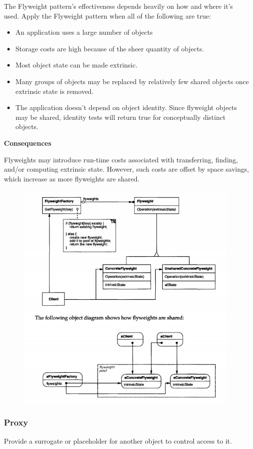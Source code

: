 \documentclass{article}
\begin{document}
The Flyweight pattern's effectiveness depends heavily on how and where it's
used. Apply the Flyweight pattern when all of the following are true:
\begin{itemize}
    \item An application uses a large number of objects
    \item Storage costs are high because of the sheer quantity of objects.
    \item Most object state can be made extrinsic.
    \item Many groups of objects may be replaced by relatively few shared objects once extrinsic state is removed.
    \item The application doesn't depend on object identity. Since flyweight objects may be shared, identity tests will return true for conceptually distinct objects.
\end{itemize}

\textbf{Consequences}

Flyweights may introduce run-time costs associated with transferring, finding,
and/or computing extrinsic state. However, such costs are offset by space savings, which increase as more flyweights are shared.


\begin{figure}[h]
    \centering
    \includegraphics[width=11cm]{diagrams/pattern-11-flyweight.png}
\end{figure}


\newpage
\subsubsection{Proxy}
Provide a surrogate or placeholder for another object to control access to it.
\end{document}
